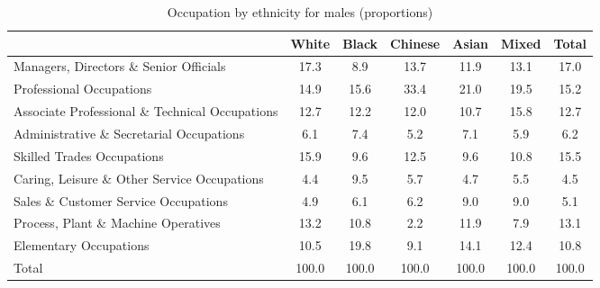 \begin{table}[htbp]\centering
\def\sym#1{\ifmmode^{#1}\else\(^{#1}\)\fi}
\caption{Occupation by ethnicity for males (proportions)}
\begin{tabular}{l*{6}{c}}
\hline\hline
          &    White&    Black&  Chinese&    Asian&    Mixed&    Total\\
\hline
Managers, Directors \& Senior Officials         &     17.3&      8.9&     13.7&     11.9&     13.1&     17.0\\
Professional Occupations         &     14.9&     15.6&     33.4&     21.0&     19.5&     15.2\\
Associate Professional \& Technical Occupations         &     12.7&     12.2&     12.0&     10.7&     15.8&     12.7\\
Administrative \& Secretarial Occupations         &      6.1&      7.4&      5.2&      7.1&      5.9&      6.2\\
Skilled Trades Occupations         &     15.9&      9.6&     12.5&      9.6&     10.8&     15.5\\
Caring, Leisure \& Other Service Occupations         &      4.4&      9.5&      5.7&      4.7&      5.5&      4.5\\
Sales \& Customer Service Occupations         &      4.9&      6.1&      6.2&      9.0&      9.0&      5.1\\
Process, Plant \& Machine Operatives         &     13.2&     10.8&      2.2&     11.9&      7.9&     13.1\\
Elementary Occupations         &     10.5&     19.8&      9.1&     14.1&     12.4&     10.8\\
Total     &    100.0&    100.0&    100.0&    100.0&    100.0&    100.0\\
\hline\hline
\end{tabular}
\end{table}
